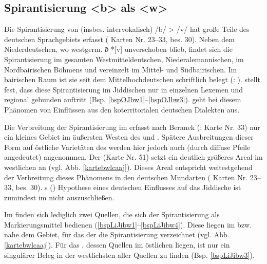 \subsection{Spirantisierung <b> als <w>}\label{bw}
Die Spirantisierung von (insbes. intervokalisch) /b/ > /v/ hat große Teile des deutschen Sprachgebiets erfasst ( Karten Nr. 23–33, bes. 30). Neben dem Niederdeutschen, wo westgerm. \textit{ƀ} *[v] unverschoben blieb, findet  sich die Spirantisierung im gesamten Westmitteldeutschen, Niederalemannischen, im Nordbairischen Böhmens und vereinzelt im Mittel- und Südbairischen. Im bairischen Raum ist sie seit dem Mittelhochdeutschen schriftlich belegt (: \citeyear[Bd. 27, Sp. 4]{DeutschesWB}).  \textcite[328, 357]{Bin-Nun1973} stellt fest, dass diese Spirantisierung im Jiddischen nur in einzelnen Lexemen und regional gebunden auftritt (Bsp. \ref{bspOJbw1}–\ref{bspOJbw3}). \textcite[357]{Bin-Nun1973} geht bei diesem Phänomen von Einflüssen aus den koterritorialen deutschen Dialekten aus.\\


Die Verbreitung der Spirantisierung im  erfasst nach Beranek (: Karte Nr. 33) nur ein kleines Gebiet im äußersten Westen des  und . Spätere Ausbreitungen dieser Form auf östliche Varietäten des  werden hier jedoch auch (durch diffuse Pfeile angedeutet) angenommen. Der  (Karte Nr. 51) setzt ein deutlich größeres Areal im westlichen  an (vgl. Abb. \ref{kartebwlcaaj}). Dieses Areal entspricht weitestgehend der Verbreitung dieses Phänomens in den deutschen Mundarten ( Karten Nr. 23–33, bes. 30). \citeauthor{Bin-Nun1973}s (\citeyear[357]{Bin-Nun1973}) Hypothese eines deutschen Einflusses auf das Jiddische ist zumindest im  nicht auszuschließen.
  
Im  finden sich lediglich zwei Quellen, die sich der Spirantisierung als Markierungsmittel bedienen (\ref{bspLiJibw1}–\ref{bspLiJibw4}). Diese liegen im bzw. nahe dem Gebiet, für das der  die Spirantisierung verzeichnet (vgl. Abb. \ref{kartebwlcaaj}). Für das , dessen Quellen im östlichen  liegen, ist nur ein singulärer Beleg in der westlichsten aller Quellen zu finden (Bsp. \ref{bspLiJibw3}).\\ 

